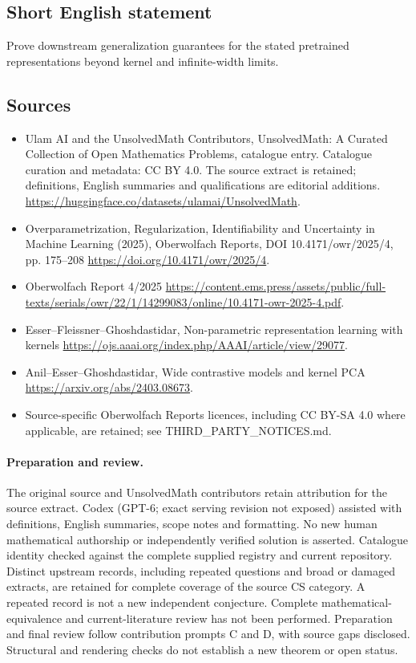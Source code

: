 \documentclass[11pt]{article}
\begin{document}
\subsection{Short English statement}
Prove downstream generalization guarantees for the stated pretrained representations beyond kernel and infinite-width limits.
\subsection{Sources}
\begin{itemize}
\item[\hypertarget{source:statement:1}{S1}] Ulam AI and the UnsolvedMath Contributors, UnsolvedMath: A Curated Collection of Open Mathematics Problems, catalogue entry. Catalogue curation and metadata: CC BY 4.0. The source extract is retained; definitions, English summaries and qualifications are editorial additions.
\url{https://huggingface.co/datasets/ulamai/UnsolvedMath}.
\item[\hypertarget{source:statement:2}{S2}] Overparametrization, Regularization, Identifiability and Uncertainty in Machine Learning (2025), Oberwolfach Reports, DOI 10.4171/owr/2025/4, pp. 175--208
\url{https://doi.org/10.4171/owr/2025/4}.
\item[\hypertarget{source:statement:3}{S3}] Oberwolfach Report 4/2025
\url{https://content.ems.press/assets/public/full-texts/serials/owr/22/1/14299083/online/10.4171-owr-2025-4.pdf}.
\item[\hypertarget{source:statement:4}{S4}] Esser--Fleissner--Ghoshdastidar, Non-parametric representation learning with kernels
\url{https://ojs.aaai.org/index.php/AAAI/article/view/29077}.
\item[\hypertarget{source:statement:5}{S5}] Anil--Esser--Ghoshdastidar, Wide contrastive models and kernel PCA
\url{https://arxiv.org/abs/2403.08673}.
\item Source-specific Oberwolfach Reports licences, including CC BY-SA 4.0 where applicable, are retained; see THIRD\_PARTY\_NOTICES.md.
\end{itemize}
\paragraph{Preparation and review.}
The original source and UnsolvedMath contributors retain attribution for the source extract. Codex (GPT-6; exact serving revision not exposed) assisted with definitions, English summaries, scope notes and formatting. No new human mathematical authorship or independently verified solution is asserted. Catalogue identity checked against the complete supplied registry and current repository. Distinct upstream records, including repeated questions and broad or damaged extracts, are retained for complete coverage of the source CS category. A repeated record is not a new independent conjecture. Complete mathematical-equivalence and current-literature review has not been performed. Preparation and final review follow contribution prompts C and D, with source gaps disclosed. Structural and rendering checks do not establish a new theorem or open status.
\label{end:statement}
\end{document}
